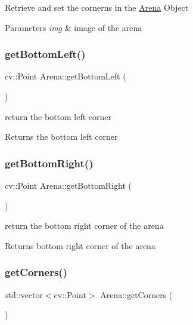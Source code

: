 Retrieve and set the cornerns in the \mbox{\hyperlink{class_arena}{Arena}} Object 
\begin{DoxyParams}{Parameters}
{\em img} & image of the arena \\
\hline
\end{DoxyParams}
\mbox{\label{class_arena_afdd88e341c385561eafbc73e90e08404}} 
\subsubsection{\texorpdfstring{get\+Bottom\+Left()}{getBottomLeft()}}
{\footnotesize\ttfamily cv\+::\+Point Arena\+::get\+Bottom\+Left (\begin{DoxyParamCaption}{ }\end{DoxyParamCaption})}

return the bottom left corner \begin{DoxyReturn}{Returns}
the bottom left corner 
\end{DoxyReturn}
\mbox{\label{class_arena_ac62870a7bfa41baa7d38c4f7373cf3f5}} 
\subsubsection{\texorpdfstring{get\+Bottom\+Right()}{getBottomRight()}}
{\footnotesize\ttfamily cv\+::\+Point Arena\+::get\+Bottom\+Right (\begin{DoxyParamCaption}{ }\end{DoxyParamCaption})}

return the bottom right corner of the arena \begin{DoxyReturn}{Returns}
bottom right corner of the arena 
\end{DoxyReturn}
\mbox{\label{class_arena_a67171d93c7aff0f9d8bd3ee0596e9033}} 
\subsubsection{\texorpdfstring{get\+Corners()}{getCorners()}}
{\footnotesize\ttfamily std\+::vector$<$cv\+::\+Point$>$ Arena\+::get\+Corners (\begin{DoxyParamCaption}{ }\end{DoxyParamCaption})}


